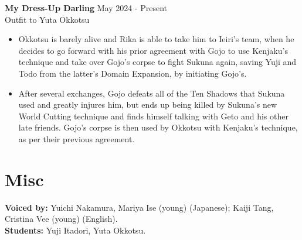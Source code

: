 \documentclass[a4paper,10pt]{article}
\begin{document}
\vspace{0.5cm}

\textbf{My Dress-Up Darling} \hfill May 2024 - Present \\
Outfit to Yuta Okkotsu
\begin{itemize}
    \item Okkotsu is barely alive and Rika is able to take him to Ieiri’s team, when he decides to go forward with his prior agreement with Gojo to use Kenjaku’s technique and take over Gojo’s corpse to fight Sukuna again, saving Yuji and Todo from the latter’s Domain Expansion, by initiating Gojo’s.
    \item After several exchanges, Gojo defeats all of the Ten Shadows that Sukuna used and greatly injures him, but ends up being killed by Sukuna’s new World Cutting technique and finds himself talking with Geto and his other late friends. Gojo’s corpse is then used by Okkotsu with Kenjaku’s technique, as per their previous agreement.
\end{itemize}

\vspace{0.5cm}

\section*{Misc}
\textbf{Voiced by:} Yuichi Nakamura, Mariya Ise (young) (Japanese); Kaiji Tang, Cristina Vee (young) (English). \\
\textbf{Students:} Yuji Itadori, Yuta Okkotsu.
\end{document}
